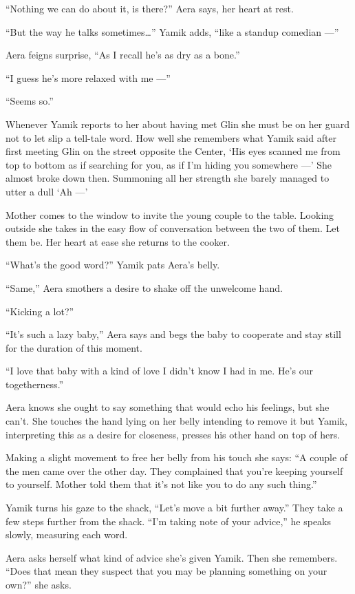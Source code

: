 \documentclass[twoside,11pt,openany]{book}
\begin{document}
``Nothing we can do about it, is there?'' Aera says, her heart at rest.

``But the way he talks sometimes{\ldots}'' Yamik adds, ``like a standup comedian
---''

Aera feigns surprise, ``As I recall he's as dry as a bone.''

``I guess he's more relaxed with me ---''

``Seems so.''

 Whenever Yamik reports to her about having met Glin she must be on her guard not to let slip a tell-tale word. How well
she remembers what Yamik said after first meeting Glin on the street opposite the Center, `His eyes scanned me from top
to bottom as if searching for you, as if I'm hiding you somewhere ---' She almost broke down then. Summoning all her
strength she barely managed to utter a dull `Ah ---'

Mother comes to the window to invite the young couple to the table. Looking outside she{ }takes in the
easy flow of conversation between the two of them. Let them be. Her heart at ease she returns to the cooker.

``What's the good word?'' Yamik pats Aera's belly.

``Same,'' Aera smothers a desire to shake off the unwelcome hand.

``Kicking a lot?''

``It's such a lazy baby,'' Aera says and begs the baby to cooperate and stay still for the
duration of this moment.

``I love that baby with a kind of love I didn't know I had in me. He's our togetherness.''

Aera knows she ought to say something that would echo his feelings, but she can't. She touches the hand lying on her
belly intending to remove it but Yamik, interpreting this as a desire for closeness, presses his other hand on top of
hers.

Making a slight movement to free her belly from his touch she says:  ``A couple of the men came over the
other day. They complained that you're keeping yourself to yourself. Mother told them that it's not like you to do any
such thing.''

Yamik turns his gaze to the shack, ``Let's move a bit further away.'' They take a few steps
further from the shack. ``I'm taking note of your advice,'' he speaks slowly, measuring each
word.

Aera asks herself what kind of advice she's given Yamik. Then she remembers. ``Does that mean they
suspect that you may be planning something on your own?'' she asks.
\end{document}

